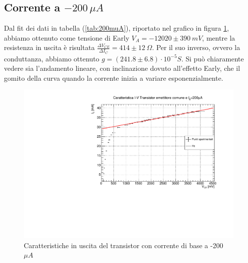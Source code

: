 \documentclass[]{article}
\begin{document}
  \subsection{Corrente a $ -200\,\mu A $}
Dal fit dei dati in tabella (\ref{tab:200muA}), riportato nel grafico in figura \ref{fig:corrente 200}, abbiamo ottenuto come tensione di Early $ V_{A}=-12020\pm390\ mV $, mentre la resistenza in uscita è risultata $ \frac{\Delta V_{CE}}{\Delta I _{C}}=414\pm12\ \Omega$. Per il suo inverso, ovvero la conduttanza, abbiamo ottenuto $ g=(241.8\pm6.8)\cdot 10^{-5} S$. Si può chiaramente vedere sia l'andamento lineare, con inclinazione dovuto all'effetto Early, che il gomito della curva quando la corrente inizia a variare esponenzialmente.
\begin{figure}[H]
	\centering
	\includegraphics[width=0.9\linewidth]{../200 muA/c1}
	\caption{Caratteristiche in uscita del transistor con corrente di base a -200 $ \mu A $}
	\label{fig:corrente 200}
\end{figure}
\end{document}

